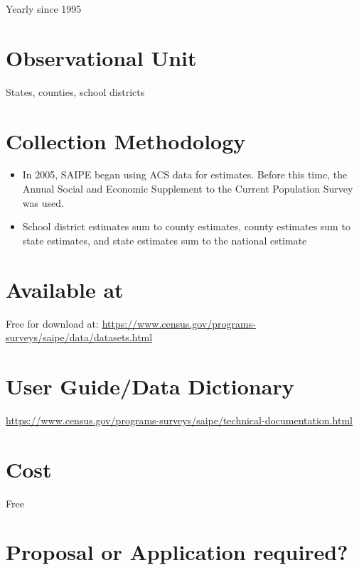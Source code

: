 \documentclass[
]{book}
\providecommand{\tightlist}{%
  \setlength{\itemsep}{0pt}\setlength{\parskip}{0pt}}
\begin{document}
Yearly since 1995

\hypertarget{observational-unit-78}{%
\section{Observational Unit}\label{observational-unit-78}}

States, counties, school districts

\hypertarget{collection-methodology-78}{%
\section{Collection Methodology}\label{collection-methodology-78}}

\begin{itemize}
\tightlist
\item
  In 2005, SAIPE began using ACS data for estimates. Before this time, the Annual Social and Economic Supplement to the Current Population Survey was used.
\item
  School district estimates sum to county estimates, county estimates sum to state estimates, and state estimates sum to the national estimate
\end{itemize}

\hypertarget{available-at-78}{%
\section{Available at}\label{available-at-78}}

Free for download at: \url{https://www.census.gov/programs-surveys/saipe/data/datasets.html}

\hypertarget{user-guidedata-dictionary-78}{%
\section{User Guide/Data Dictionary}\label{user-guidedata-dictionary-78}}

\url{https://www.census.gov/programs-surveys/saipe/technical-documentation.html}

\hypertarget{cost-78}{%
\section{Cost}\label{cost-78}}

Free

\hypertarget{proposal-or-application-required-78}{%
\section{Proposal or Application required?}\label{proposal-or-application-required-78}}
\end{document}
